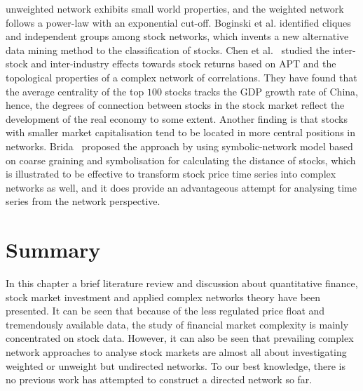 unweighted network exhibits small world properties, and the weighted network follows a power-law with an exponential cut-off. Boginski et al. \cite{statisticalanalysis} identified cliques and independent groups among stock networks, which  invents a new alternative data mining method to the classification of stocks. Chen et al.~\cite{CHEN2015224} studied the inter-stock and inter-industry effects towards stock returns based on APT and the topological properties of a complex network of correlations. They have found that the average centrality of the top $100$ stocks tracks the GDP growth rate of China, hence, the degrees of connection between stocks in the stock market reflect the development of the real economy to some extent. Another finding is that stocks with smaller market capitalisation tend to be located in more central positions in networks. Brida~\cite{brida2002high} proposed the approach by using symbolic-network model based on coarse graining and symbolisation for calculating the distance of stocks, which is illustrated to be effective to transform stock price time series into complex networks as well, and it does provide an advantageous attempt for analysing time series from the network perspective.


\section{Summary}
In this chapter a brief literature review and discussion about quantitative finance, stock market investment and applied complex networks theory have been presented. It can be seen that because of the less regulated price float and tremendously available data, the study of financial market complexity is mainly concentrated on stock data. However, it can also be seen that prevailing complex network approaches to analyse stock markets are almost all about investigating weighted or unweight but undirected networks. To our best knowledge, there is no previous work has attempted to construct a directed network so far.
